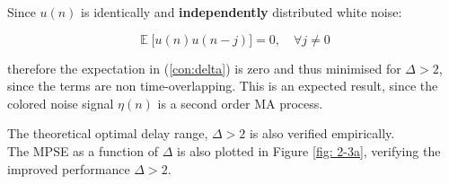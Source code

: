\documentclass[12pt]{article}
\DeclareMathOperator*{\E}{\mathbb{E}}
\begin{document}
		Since $u(n)$ is identically and \textbf{independently} distributed white noise:
		
		\begin{equation}
		\E \bigg[ u(n) u(n - j) \bigg] = 0, \quad \forall j \neq 0
		\end{equation}
		
		therefore the expectation in (\ref{con:delta}) is zero and thus minimised for $\Delta > 2$, since the terms are non time-overlapping.
		This is an expected result, since the colored noise signal $\eta(n)$ is a second order MA process.
		
		The theoretical optimal delay range, $\Delta > 2$ is also verified empirically. \\
		The MPSE as a function of $\Delta$ is also plotted in Figure \ref{fig: 2-3a}, verifying the improved performance $\Delta > 2$.
		
\end{document}
